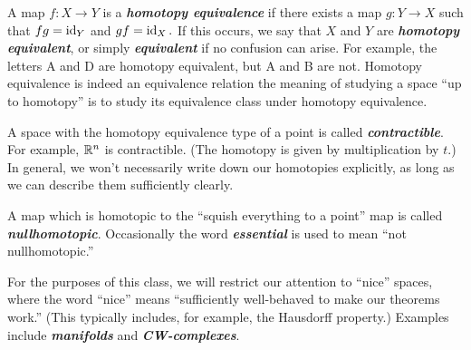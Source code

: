 \documentclass{article}
\begin{document}
A map $f: X \to Y$ is a \textbf{\emph{homotopy equivalence}} if there exists a map $g: Y \to X$ such that $fg = \operatorname{id}_Y$ and $gf = \operatorname{id}_X.$ If this occurs, we say that $X$ and $Y$ are \textbf{\emph{homotopy equivalent}}, or simply \textbf{\emph{equivalent}} if no confusion can arise. For example, the letters A and D are homotopy equivalent, but A and B are not. Homotopy equivalence is indeed an equivalence relation \textemdash{} the meaning of studying a space \textquotedblleft{}up to homotopy\textquotedblright{} is to study its equivalence class under homotopy equivalence.%

A space with the homotopy equivalence type of a point is called \textbf{\emph{contractible}}. For example, $\mathbb{R}^n$ is contractible. (The homotopy is given by multiplication by $t.$) In general, we won't necessarily write down our homotopies explicitly, as long as we can describe them sufficiently clearly.%

A map which is homotopic to the \textquotedblleft{}squish everything to a point\textquotedblright{} map is called \textbf{\emph{nullhomotopic}}. Occasionally the word \textbf{\emph{essential}} is used to mean \textquotedblleft{}not nullhomotopic.\textquotedblright{}%

For the purposes of this class, we will restrict our attention to \textquotedblleft{}nice\textquotedblright{} spaces, where the word \textquotedblleft{}nice\textquotedblright{} means \textquotedblleft{}sufficiently well-behaved to make our theorems work.\textquotedblright{} (This typically includes, for example, the Hausdorff property.) Examples include \textbf{\emph{manifolds}} and \textbf{\emph{CW-complexes}}.%
\end{document}

